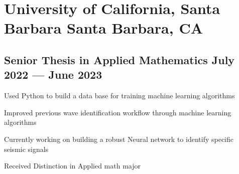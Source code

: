 \documentclass[a4paper,12pt]{article}
\begin{document}
\section{University of California, Santa Barbara Santa Barbara, CA} 
\subsection{{Senior Thesis in Applied Mathematics  July 2022 --- June 2023}}
\vspace*{3pt}
\begin{zitemize}
\item Used Python to build a data base for training machine learning algorithms
\item Improved previous wave identification workflow through machine learning algorithms
\item Currently working on building a robust Neural network to identify specific seismic signals
\item Received Distinction in Applied math major
\end{zitemize}

\end{document}
